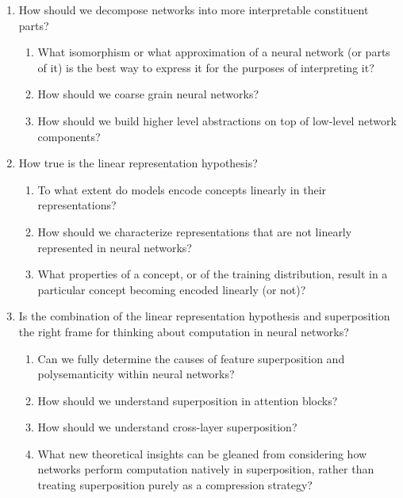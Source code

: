 \begin{enumerate}
    \item How should we decompose networks into more interpretable constituent parts?
    \begin{enumerate}[label=\alph*.]
        \item What isomorphism or what approximation of a neural network (or parts of it) is the best way to express it for the purposes of interpreting it?
        \item How should we coarse grain neural networks?
        \item How should we build higher level abstractions on top of low-level network components?
    \end{enumerate}
    
    \item How true is the linear representation hypothesis?
    \begin{enumerate}[label=\alph*.]
        \item To what extent do models encode concepts linearly in their representations?
        \item How should we characterize representations that are not linearly represented in neural networks?
        \item What properties of a concept, or of the training distribution, result in a particular concept becoming encoded linearly (or not)?
    \end{enumerate}
    
    \item Is the combination of the linear representation hypothesis and superposition the right frame for thinking about computation in neural networks?
    \begin{enumerate}[label=\alph*.]
        \item Can we fully determine the causes of feature superposition and polysemanticity within neural networks?
        \item How should we understand superposition in attention blocks?
        \item How should we understand cross-layer superposition?
        \item What new theoretical insights can be gleaned from considering how networks perform computation natively in superposition, rather than treating superposition purely as a compression strategy?
    \end{enumerate}
    

\end{enumerate}
